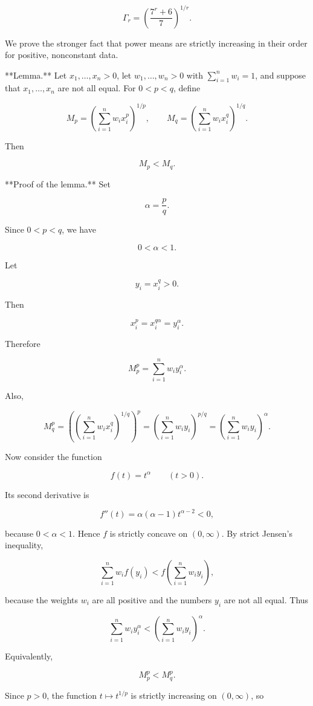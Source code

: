 \[
\Gamma_r=\left(\frac{7^r+6}{7}\right)^{1/r}.
\]

We prove the stronger fact that power means are strictly increasing in their order for positive, nonconstant data.

**Lemma.** Let \(x_1,\dots,x_n>0\), let \(w_1,\dots,w_n>0\) with \(\sum_{i=1}^n w_i=1\), and suppose that \(x_1,\dots,x_n\) are not all equal. For \(0<p<q\), define

\[
M_p=\left(\sum_{i=1}^n w_i x_i^p\right)^{1/p},
\qquad
M_q=\left(\sum_{i=1}^n w_i x_i^q\right)^{1/q}.
\]

Then

\[
M_p<M_q.
\]

**Proof of the lemma.** Set

\[
\alpha=\frac{p}{q}.
\]

Since \(0<p<q\), we have

\[
0<\alpha<1.
\]

Let

\[
y_i=x_i^q>0.
\]

Then

\[
x_i^p=x_i^{q\alpha}=y_i^\alpha.
\]

Therefore

\[
M_p^p=\sum_{i=1}^n w_i y_i^\alpha.
\]

Also,

\[
M_q^p
=
\left(\left(\sum_{i=1}^n w_i x_i^q\right)^{1/q}\right)^p
=
\left(\sum_{i=1}^n w_i y_i\right)^{p/q}
=
\left(\sum_{i=1}^n w_i y_i\right)^\alpha.
\]

Now consider the function

\[
f(t)=t^\alpha
\qquad (t>0).
\]

Its second derivative is

\[
f''(t)=\alpha(\alpha-1)t^{\alpha-2}<0,
\]

because \(0<\alpha<1\). Hence \(f\) is strictly concave on \((0,\infty)\). By strict Jensen’s inequality,

\[
\sum_{i=1}^n w_i f(y_i)
<
f\left(\sum_{i=1}^n w_i y_i\right),
\]

because the weights \(w_i\) are all positive and the numbers \(y_i\) are not all equal. Thus

\[
\sum_{i=1}^n w_i y_i^\alpha
<
\left(\sum_{i=1}^n w_i y_i\right)^\alpha.
\]

Equivalently,

\[
M_p^p<M_q^p.
\]

Since \(p>0\), the function \(t\mapsto t^{1/p}\) is strictly increasing on \((0,\infty)\), so

